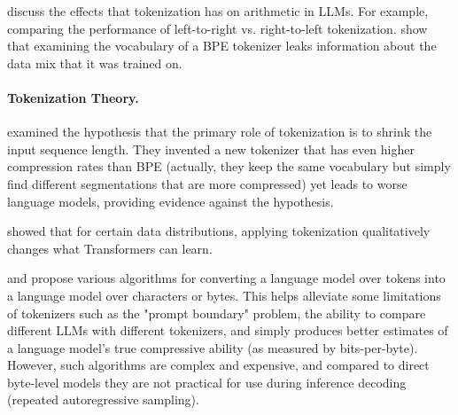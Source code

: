 \citet{lee2024digitstodecisions} discuss the effects that tokenization has on arithmetic in LLMs. For example, comparing the performance of left-to-right vs. right-to-left tokenization.
\citet{hayase2024data} show that examining the vocabulary of a BPE tokenizer leaks information about the data mix that it was trained on.

\paragraph{Tokenization Theory.}

\citet{schmidt2024tokenization}
examined the hypothesis that the primary role of tokenization is to shrink the input sequence length. They invented a new tokenizer that has even higher compression rates than BPE (actually, they keep the same vocabulary but simply find different segmentations that are more compressed) yet leads to worse language models, providing evidence against the hypothesis.

\citet{rajaraman2024analysis} showed that for certain data distributions, applying tokenization qualitatively changes what Transformers can learn. 

\citet{phan2024exact} and \citet{vieira2024language} propose various algorithms for converting a language model over tokens into a language model over characters or bytes.
This helps alleviate some limitations of tokenizers such as the "prompt boundary" problem, the ability to compare different LLMs with different tokenizers, and simply produces better estimates of a language model's true compressive ability (as measured by bits-per-byte).
However, such algorithms are complex and expensive, and compared to direct byte-level models they are not practical for use during inference decoding (repeated autoregressive sampling).

